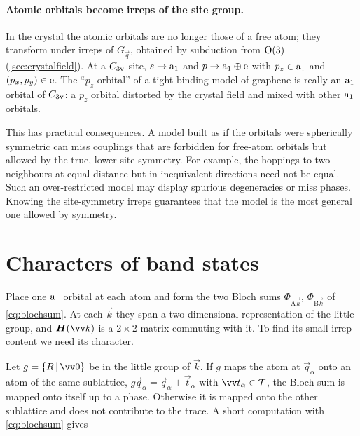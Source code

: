 \paragraph{Atomic orbitals become irreps of the site group.} In the crystal the atomic
orbitals are no longer those of a free atom; they transform under irreps of
$G_{\vec{q}}$, obtained by subduction from $\mathrm{O}(3)$ (\cref{sec:crystalfield}). At a
$C_{3\mathrm{v}}$ site, $s\to\mathrm{a}_1$ and $p\to\mathrm{a}_1\oplus\mathrm{e}$ with $p_z\in\mathrm{a}_1$
and $(p_x,p_y)\in\mathrm{e}$. The ``$p_z$ orbital'' of a tight-binding model of graphene
is really an $\mathrm{a}_1$ orbital of $C_{3\mathrm{v}}$: a $p_z$ orbital distorted by the crystal
field and mixed with other $\mathrm{a}_1$ orbitals.

This has practical consequences. A model built as if the orbitals were spherically
symmetric can miss couplings that are forbidden for free-atom orbitals but allowed by
the true, lower site symmetry. For example, the hoppings to two neighbours at equal
distance but in inequivalent directions need not be equal. Such an over-restricted
model may display spurious degeneracies or miss phases. Knowing the site-symmetry
irreps guarantees that the model is the most general one allowed by symmetry.

\section{Characters of band states}

Place one $\mathrm{a}_1$ orbital at each atom and form the two Bloch sums
$\Phi_{\mathrm{A}\vec{k}}$, $\Phi_{\mathrm{B}\vec{k}}$ of \eqref{eq:blochsum}. At each
$\vec{k}$ they span a two-dimensional representation of the little group, and
$\mat{H}(\vec{k})$ is a $2\times2$ matrix commuting with it. To find its small-irrep
content we need its character.

Let $g=\seitz{R}{\vec{0}}$ be in the little group of $\vec{k}$. If $g$ maps the atom at
$\vec{q}_\alpha$ onto an atom of the same sublattice, $g\vec{q}_\alpha=\vec{q}_\alpha+\vec{t}_\alpha$
with $\vec{t}_\alpha\in\Tgroup$, the Bloch sum is mapped onto itself up to a phase.
Otherwise it is mapped onto the other sublattice and does not contribute to the trace.
A short computation with \eqref{eq:blochsum} gives

